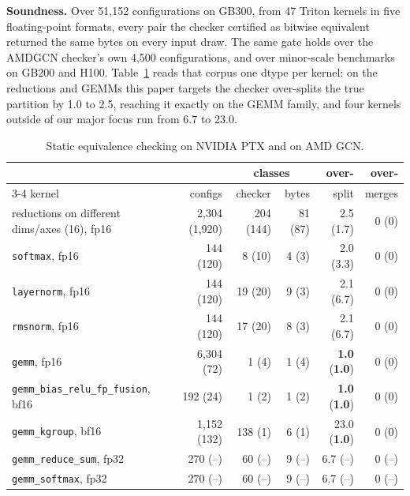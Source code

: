 \documentclass[sigplan,nonacm]{acmart}
\newcommand{\amd}[1]{{\color{amdblue}(#1)}}
\begin{document}
\textbf{Soundness.} Over 51,152 configurations on GB300, from 47 Triton kernels in
five floating-point formats, every pair the checker certified as bitwise
equivalent returned the same bytes on every input draw. The same gate holds over the AMDGCN
checker's own 4,500 configurations, and over minor-scale benchmarks on GB200 and
H100. Table~\ref{tab:checker}
reads that corpus one dtype per kernel: on the reductions and GEMMs this
paper targets the checker over-splits the true partition by 1.0 to 2.5, reaching
it exactly on the GEMM family, and four kernels outside of our major focus
run from 6.7 to 23.0.


\begin{table}[!ht]
  \centering
  \caption{Static equivalence checking on NVIDIA PTX and on AMD GCN.}
  \label{tab:checker}
  \footnotesize
  \setlength{\tabcolsep}{1.2pt}
  {\fontsize{6.2}{7.2}\selectfont
  \begin{tabular}{lrrrrr}
    \toprule
                 &         & \multicolumn{2}{c}{classes} & over-  & over-  \\
    \cmidrule(lr){3-4}
    kernel       & configs & checker & bytes & split  & merges \\
    \midrule
    reductions on different dims/axes (16), fp16
      & 2,304 \amd{1,920} & 204 \amd{144} & 81 \amd{87} & 2.5 \amd{1.7} & 0 \amd{0} \\
    \texttt{softmax}, fp16
      & 144 \amd{120} & 8 \amd{10} & 4 \amd{3} & 2.0 \amd{3.3} & 0 \amd{0} \\
    \texttt{layernorm}, fp16
      & 144 \amd{120} & 19 \amd{20} & 9 \amd{3} & 2.1 \amd{6.7} & 0 \amd{0} \\
    \texttt{rmsnorm}, fp16
      & 144 \amd{120} & 17 \amd{20} & 8 \amd{3} & 2.1 \amd{6.7} & 0 \amd{0} \\
    \texttt{gemm}, fp16
      & 6,304 \amd{72} & 1 \amd{4} & 1 \amd{4} & \textbf{1.0} \amd{\textbf{1.0}} & 0 \amd{0} \\
    \texttt{gemm\_bias\_relu\_fp\_fusion}, bf16
      & 192 \amd{24} & 1 \amd{2} & 1 \amd{2} & \textbf{1.0} \amd{\textbf{1.0}} & 0 \amd{0} \\
    \texttt{gemm\_kgroup}, bf16
      & 1,152 \amd{132} & 138 \amd{1} & 6 \amd{1} & 23.0 \amd{\textbf{1.0}} & 0 \amd{0} \\
    \texttt{gemm\_reduce\_sum}, fp32
      & 270 \amd{--} & 60 \amd{--} & 9 \amd{--} & 6.7 \amd{--} & 0 \amd{--} \\
    \texttt{gemm\_softmax}, fp32
      & 270 \amd{--} & 60 \amd{--} & 9 \amd{--} & 6.7 \amd{--} & 0 \amd{--} \\

\end{tabular}}
\end{table}
\end{document}
